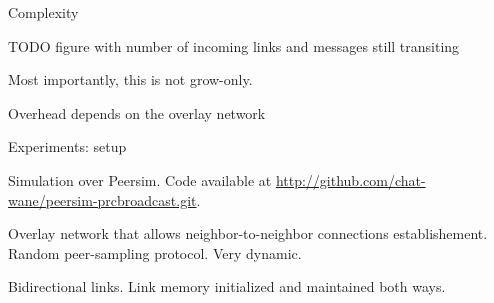 \documentclass[10pt, xcolor={usenames, dvipsnames}]{beamer}
\begin{document}
\begin{frame}{Complexity}

  \begin{table}
    \begin{center}
      
    \end{center}
  \end{table}

  TODO figure with number of incoming links and messages still transiting

  Most importantly, this is not grow-only.

\end{frame}

\begin{frame}{Overhead depends on the overlay network}

  \begin{table}
    \begin{center}
      
    \end{center}
  \end{table}

  \vspace{3em}
  

  \begin{center}
    \begin{table}
      \begin{center}
        
      \end{center}
    \end{table}
  \end{center}

\end{frame}


\begin{frame}{Experiments: setup}
  
  Simulation over Peersim. Code available at \url{http://github.com/chat-wane/peersim-prcbroadcast.git}.

  Overlay network that allows neighbor-to-neighbor connections
  establishement. Random peer-sampling protocol. Very dynamic.
  
  Bidirectional links. Link memory initialized and maintained both ways.
    
\end{frame}
\end{document}
